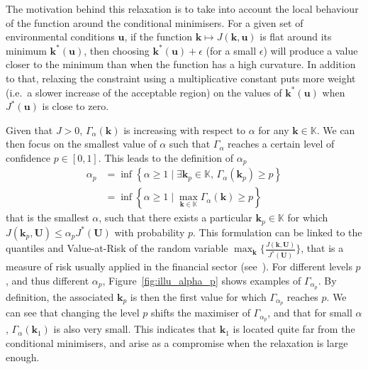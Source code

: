 \documentclass[preprint, 1p]{elsarticle}
\newcommand{\checkap}{{\alpha}_p}
\newcommand{\checkkp}{{\mathbf{k}}_p}
\newcommand{\Kspace}{\mathbb{K}}
\begin{document}
The motivation behind this relaxation is to take into account the local behaviour of the function around the conditional minimisers.
For a given set of environmental conditions $\mathbf{u}$, if the function $\mathbf{k} \mapsto J(\mathbf{k},\mathbf{u})$ is flat around its minimum $\mathbf{k}^*(\mathbf{u})$, then choosing  $\mathbf{k}^*(\mathbf{u}) + \epsilon$ (for a small $\epsilon$) will produce a value closer to the minimum than when the function has a high curvature.
In addition to that, relaxing the constraint using a multiplicative constant puts more weight (i.e.\ a slower increase of the acceptable region) on the values of $\mathbf{k}^*(\mathbf{u})$ when $J^*(\mathbf{u})$ is close to zero.

Given that $J>0$, $\Gamma_{\alpha}(\mathbf{k})$ is increasing with respect to $\alpha$ for any $\mathbf{k}\in\Kspace$. We can then focus on the smallest value of $\alpha$ such that $\Gamma_\alpha$ reaches a certain level of confidence $p\in[0,1]$. This leads to the definition of $\checkap$
\begin{align}
  \checkap &= \inf\left\{ \alpha\geq 1 \mid \exists \checkkp \in \Kspace,\, \Gamma_{\alpha}(\checkkp) \geq p \right\} \nonumber \\
   &= \inf \left\{ \alpha \geq 1 \mid \max_{\mathbf{k}\in\Kspace} \Gamma_{\alpha}(\mathbf{k}) \geq p \right\}   \label{eq:def_alpha_check}
\end{align}
that is the smallest $\alpha$, such that there exists a particular $\checkkp \in \Kspace$ for which $J(\checkkp,\mathbf{U}) \leq \checkap J^*(\mathbf{U})$ with probability $p$. This formulation can be linked to the quantiles and Value-at-Risk of the random variable $\max_{\mathbf{k}} \{ \frac{J(\mathbf{k},\mathbf{U})}{J^*(\mathbf{U})}\}$, that is a measure of risk usually applied in the financial sector (see~\cite{rockafellar_deviation_2002}). For different levels $p$, and thus different $\alpha_p$, Figure~\ref{fig:illu_alpha_p} shows examples of $\Gamma_{\alpha_p}$. By definition, the associated $\mathbf{k}_p$ is then the first value for which $\Gamma_{\alpha_p}$ reaches $p$. We can see that changing the level $p$ shifts the maximiser of $\Gamma_{\alpha_p}$, and that for small $\alpha$, $\Gamma_{\alpha}(\mathbf{k}_1)$ is also very small. This indicates that $\mathbf{k}_1$ is located quite far from the conditional minimisers, and arise as a compromise when the relaxation is large enough.
\end{document}
